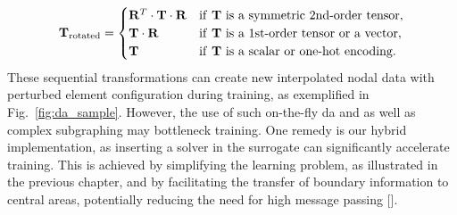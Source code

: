 \documentclass[12pt,a4paper]{report}
\begin{document}
\begin{equation}
\mathbf{T}_\text{rotated} = \begin{cases}
\mathbf{R}^{T} \cdot \mathbf{T} \cdot \mathbf{R} & \text{if \textbf{T} is a symmetric 2nd-order tensor}, \\
\mathbf{T} \cdot \mathbf{R} & \text{if \textbf{T} is a 1st-order tensor or a vector}, \\
\mathbf{T} & \text{if \textbf{T} is a scalar or one-hot encoding}. \\
\end{cases}
\end{equation}
%
These sequential transformations can create new interpolated nodal data with perturbed element configuration during training, as exemplified in Fig.~\ref{fig:da_sample}. However, the use of such on-the-fly \ac{da} and as well as complex subgraphing may bottleneck training. One remedy is our hybrid implementation, as inserting a solver in the surrogate can significantly accelerate training. This is achieved by simplifying the learning problem, as illustrated in the previous chapter, and by facilitating the transfer of boundary information to central areas, potentially reducing the need for high message passing [\cite{um2020}].
\end{document}
